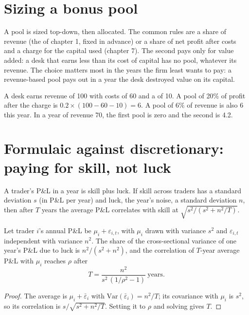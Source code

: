 \section{Sizing a bonus pool}

A pool is sized top-down, then allocated. The common rules are a share of revenue (the  of chapter 1, fixed in advance) or a
share of net profit after costs and a charge for the capital used (chapter 7). The second pays only for value added: a desk that earns less than its
cost of capital has no pool, whatever its revenue. The choice matters most in the years the firm least wants to pay: a revenue-based pool pays out
in a year the desk destroyed value on its capital.

\begin{example}\label{ex:fm:hiring-and-compensation:pools}
A desk earns revenue of 100 with costs of 60 and a  of 10. A pool of 20\% of profit after the charge is $0.2\times(100-60-10)=6$. A
pool of 6\% of revenue is also 6 this year. In a year of revenue 70, the first pool is zero and the second is 4.2.
\end{example}

\section{Formulaic against discretionary: paying for skill, not luck}

A trader's P\&L in a year is skill plus luck. If skill across traders has a standard deviation $s$ (in P\&L per year) and luck, the year's noise, a
standard deviation $n$, then after $T$ years the average P\&L correlates with skill at $\sqrt{s^2/(s^2+n^2/T)}$.

\begin{proposition}\label{prop:fm:hiring-and-compensation:years}
Let trader $i$'s annual P\&L be $\mu_i+\varepsilon_{i,t}$, with $\mu_i$ drawn with variance $s^2$ and $\varepsilon_{i,t}$ independent with
variance $n^2$. The share of the cross-sectional variance of one year's P\&L due to luck is $n^2/(s^2+n^2)$, and the correlation of $T$-year average
P\&L with $\mu_i$ reaches $\rho$ after
\[
T=\frac{n^2}{s^2\,(1/\rho^2-1)}\ \text{years}.
\]
\end{proposition}

\begin{proof}
The average is $\mu_i+\bar\varepsilon_i$ with $\mathrm{Var}(\bar\varepsilon_i)=n^2/T$; its covariance with $\mu_i$ is $s^2$, so its correlation
is $s/\sqrt{s^2+n^2/T}$. Setting it to $\rho$ and solving gives $T$.
\end{proof}

